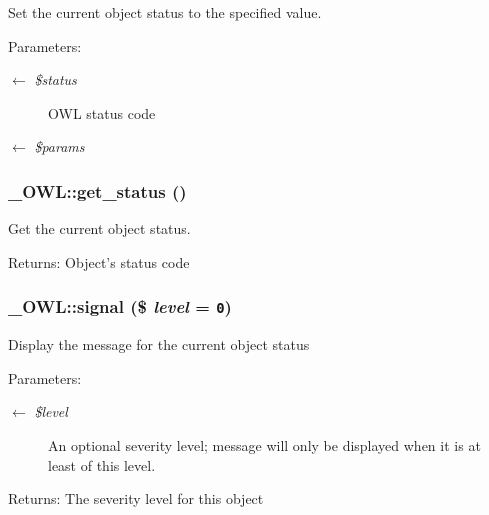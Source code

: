 Set the current object status to the specified value.

\begin{Desc}
\item[Parameters:]
\begin{description}
\item[\mbox{$\leftarrow$} {\em \$status}]OWL status code \item[\mbox{$\leftarrow$} {\em \$params}]\end{description}
\end{Desc}
\hypertarget{class__OWL_99ec771fa2c5c279f80152cc09e489a8}{
\subsubsection{\setlength{\rightskip}{0pt plus 5cm}\_\-OWL::get\_\-status ()}}
\label{class__OWL_99ec771fa2c5c279f80152cc09e489a8}


Get the current object status.

\begin{Desc}
\item[Returns:]Object's status code \end{Desc}
\hypertarget{class__OWL_61c04b80fe17e2f1e339a6d6a89e45f3}{
\subsubsection{\setlength{\rightskip}{0pt plus 5cm}\_\-OWL::signal (\$ {\em level} = {\tt 0})}}
\label{class__OWL_61c04b80fe17e2f1e339a6d6a89e45f3}


Display the message for the current object status

\begin{Desc}
\item[Parameters:]
\begin{description}
\item[\mbox{$\leftarrow$} {\em \$level}]An optional severity level; message will only be displayed when it is at least of this level. \end{description}
\end{Desc}
\begin{Desc}
\item[Returns:]The severity level for this object \end{Desc}


